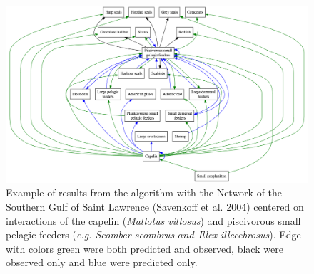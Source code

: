 \documentclass[letterpaper]{article}
\begin{document}
\newpage
    \begin{figure}[h]
      \centering\includegraphics[width=\textwidth]{SGSL.png}
      \caption{Example of results from the algorithm with the Network of the Southern Gulf of Saint Lawrence (Savenkoff et al. 2004) centered on interactions of the capelin (\textit{Mallotus villosus}) and piscivorous small pelagic feeders (\textit{e.g. Scomber scombrus $and$ Illex illecebrosus}). Edge with colors green were both predicted and observed, black were observed only and blue were predicted only.}
      \label{fig:SGSL}
    \end{figure}
\end{document}
